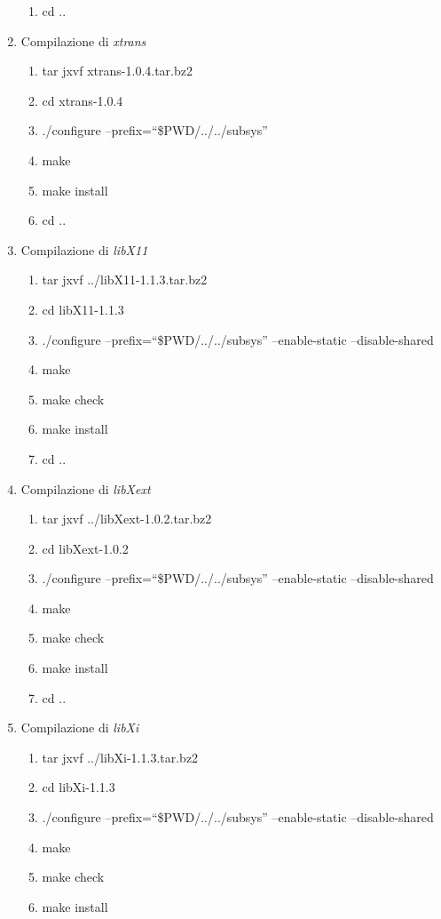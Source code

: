 \begin{enumerate}
\begin{enumerate}
\item cd ..
\end{enumerate}
\item Compilazione di \emph{xtrans}
\begin{enumerate}
\item tar jxvf xtrans-1.0.4.tar.bz2 
\item cd xtrans-1.0.4
\item ./configure --prefix=``\$PWD/../../subsys''
\item make
\item make install
\item cd ..
\end{enumerate}
\item Compilazione di \emph{libX11}
\begin{enumerate}
\item tar jxvf ../libX11-1.1.3.tar.bz2
\item cd libX11-1.1.3
\item ./configure --prefix=``\$PWD/../../subsys'' --enable-static --disable-shared
\item make
\item make check
\item make install
\item cd ..
\end{enumerate}
\item Compilazione di \emph{libXext}
\begin{enumerate}
\item tar jxvf ../libXext-1.0.2.tar.bz2
\item cd libXext-1.0.2
\item ./configure --prefix=``\$PWD/../../subsys'' --enable-static --disable-shared
\item make
\item make check
\item make install
\item cd ..
\end{enumerate}
\item Compilazione di \emph{libXi}
\begin{enumerate}
\item tar jxvf ../libXi-1.1.3.tar.bz2
\item cd libXi-1.1.3
\item ./configure --prefix=``\$PWD/../../subsys'' --enable-static --disable-shared
\item make
\item make check
\item make install

\end{enumerate}
\end{enumerate}
